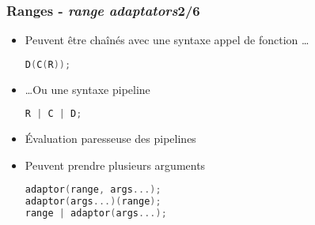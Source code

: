 \documentclass[C++.tex]{subfiles}
\begin{document}
\begin{frame}[fragile]
	\frametitle{Ranges - \textit{range adaptators}\titlehfill{}2/6}
	\begin{itemize}
		\item Peuvent être chaînés avec une syntaxe \og appel de fonction\fg{} \ldots

		\begin{lstlisting}[language=C++]
D(C(R));\end{lstlisting}
		
		\item \ldots Ou une syntaxe \og pipeline\fg{}

		\begin{lstlisting}[language=C++]
R | C | D;\end{lstlisting}

		\item Évaluation paresseuse des pipelines
		\item Peuvent prendre plusieurs arguments


		\begin{lstlisting}[language=C++]
adaptor(range, args...);
adaptor(args...)(range);
range | adaptor(args...);\end{lstlisting}

	\end{itemize}
\end{frame}
\end{document}
